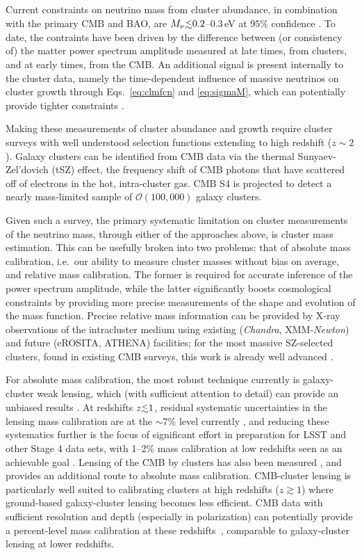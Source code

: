 Current constraints on neutrino mass from cluster abundance, in combination with the primary CMB and BAO, are $M_\nu \lsim 0.2$--$0.3$\,eV at $95\%$ confidence \cite{Hasselfield:2013wf,Mantz:2014paa,Ade:2015fva,deHaan:2016qvy}. To date, the contraints have been driven by the difference between (or consistency of) the matter power spectrum amplitude measured at late times, from clusters, and at early times, from the CMB. An additional signal is present internally to the cluster data, namely the time-dependent influence of massive neutrinos on cluster growth through Eqs.~\ref{eq:clmfcn} and \ref{eq:sigmaM}, which can potentially provide tighter constraints \cite{Wang:2005vr}.


Making these measurements of cluster abundance and growth require cluster surveys with well understood selection functions extending to high redshift ($z\sim2$). Galaxy clusters can be identified from CMB data via the thermal Sunyaev-Zel'dovich (tSZ) effect, the frequency shift of CMB photons that have scattered off of electrons in the hot, intra-cluster gas.  CMB S4 is projected to detect a nearly mass-limited sample of $\mathcal{O}(100,000)$ galaxy clusters.

Given such a survey, the primary systematic limitation on cluster measurements of the neutrino mass, through either of the approaches above, is cluster mass estimation. This can be usefully broken into two problems: that of absolute mass calibration, i.e.\ our ability to measure cluster masses without bias on average, and relative mass calibration. The former is required for accurate inference of the power spectrum amplitude, while the latter significantly boosts cosmological constraints by providing more precise measurements of the shape and evolution of the mass function. Precise relative mass information can be provided by X-ray observations of the intracluster medium using existing ({\it Chandra}, XMM-{\it Newton}) and future (eROSITA, ATHENA) facilities; for the most massive SZ-selected clusters, found in existing CMB surveys, this work is already well advanced \cite{deHaan:2016qvy, Andersson:2010vy}. 

For absolute mass calibration, the most robust technique currently is galaxy-cluster weak lensing, which (with sufficient attention to detail) can provide an unbiased results \cite{Corless:2009hi,Becker:2010xj}. At redshifts $z\lsim1$, residual systematic uncertainties in the lensing mass calibration are at the $\sim7\%$ level currently \cite{Applegate:2012kr}, and reducing these systematics further is the focus of significant effort in preparation for LSST and other Stage 4 data sets, with 1--2\% mass calibration at low redshifts seen as an achievable goal \cite{Abate:2012za}. Lensing of the CMB by clusters has also been measured \cite{Madhavacheril:2014slf,Baxter:2014frs}, and provides an additional route to absolute mass calibration. CMB-cluster lensing is particularly well suited to calibrating clusters at high redshifts ($z\gtrsim1$) where ground-based galaxy-cluster lensing becomes less efficient. CMB data with sufficient resolution and depth (especially in polarization) can potentially provide a percent-level mass calibration at these redshifts~\cite{Hu:2007bt}, comparable to galaxy-cluster lensing at lower redshifts.

